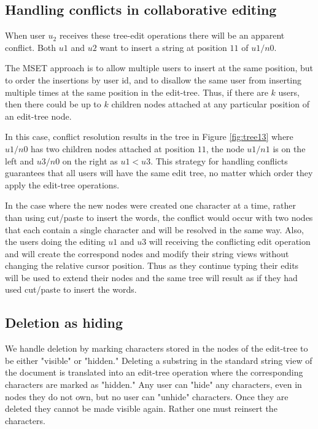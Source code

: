 \documentclass{amsart}
\begin{document}
\subsection{Handling conflicts in collaborative editing}
When user $u_2$ receives these tree-edit operations there will be an
apparent conflict. Both $u1$ and $u2$ want to insert a string at position
$11$ of $u1/n0$.  

The MSET approach is to allow multiple users to insert at
the same position, but to order the insertions by user id, and to disallow
the same user from inserting multiple times at the same position in the edit-tree.
Thus, if there are $k$ users, then there could be up to $k$ children nodes
attached at any particular position of an edit-tree node.

In this case, conflict resolution results in the tree in Figure
\ref{fig:tree13} where $u1/n0$ has two children nodes attached at position $11$,
the node $u1/n1$ is on the left and $u3/n0$ on the right as $u1<u3$.
This strategy for handling conflicts guarantees that all users will have
the same edit tree, no matter which order they apply the edit-tree operations.

In the case where the new nodes were created one character at a time, rather
than using cut/paste to insert the words, the conflict would occur with two
nodes that each contain a single character and will be resolved in the same
way.  Also, the users doing the editing $u1$ and $u3$ will receiving the
conflicting edit operation and will create the correspond nodes and modify
their string views without changing the relative cursor position. Thus as they
continue typing their edits will be used to extend their nodes and the
same tree will result as if they had used cut/paste to insert the words.


\subsection{Deletion as hiding}

We handle deletion by marking characters stored in the nodes of the edit-tree 
to be either "visible" or "hidden."  Deleting a substring in the standard string
view of the document is translated into an edit-tree operation where the
corresponding characters are marked as "hidden."  Any user can "hide" any
characters, even in nodes they do not own, but no user can "unhide" characters.
Once they are deleted they cannot be made visible again. Rather one must
reinsert the characters.
\end{document}
